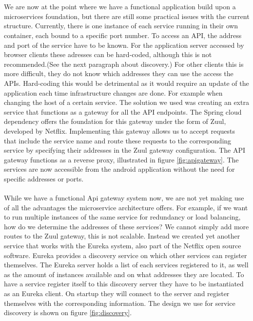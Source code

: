 \documentclass[12pt]{article}
\begin{document}
\begin{multicols}{2}
\\\\
We are now at the point where we have a functional application build upon a microservices foundation, but there are still some practical issues with the current structure. Currently, there is one instance of each service running in their own container, each bound to a specific port number. To access an API, the address and port of the service have to be known. For the application server accessed by browser clients these adresses can be hard-coded, although this is not recommended.(See the next paragraph about discovery.) For other clients this is more difficult, they do not know which addresses they can use the access the APIs. Hard-coding this would be detrimental as it would require an update of the application each time infrastructure changes are done. For example when changing the host of a certain service. The solution we used was creating an extra service that functions as a gateway for all the API endpoints. The Spring cloud dependency offers the foundation for this gateway under the form of Zuul, developed by Netflix. \cite{NetflixZuul76:online} Implementing this gateway allows us to accept requests that include the service name and route these requests to the corresponding service by specifying their addresses in the Zuul gateway configuration. The API gateway functions as a reverse proxy, illustrated in figure \ref{fig:apigateway}. The services are now accessible from the android application without the need for specific addresses or ports.
\\\\
\noindent While we have a functional Api gateway system now, we are not yet making use of all the advantages the microservice architecture offers. For example, if we want to run multiple instances of the same service for redundancy or load balancing, how do we determine the addresses of these services? We cannot simply add more routes to the Zuul gateway, this is not scalable. Instead we created yet another service that works with the Eureka system, also part of the Netflix open source software. Eureka provides a discovery service on which other services can register themselves. The Eureka server holds a list of each services registered to it, as well as the amount of instances available and on what addresses they are located. To have a service register itself to this discovery server they have to be instantiated as an Eureka client. On startup they will connect to the server and register themselves with the corresponding information. The design we use for service discovery is shown on figure \ref{fig:discovery}.

\end{multicols}
\end{document}
